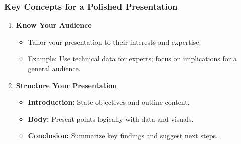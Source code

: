 \documentclass[aspectratio=169]{beamer}
\begin{document}
\begin{frame}
    \frametitle{Key Concepts for a Polished Presentation}
    \begin{enumerate}
        \item \textbf{Know Your Audience}
            \begin{itemize}
                \item Tailor your presentation to their interests and expertise.
                \item Example: Use technical data for experts; focus on implications for a general audience.
            \end{itemize}
        
        \item \textbf{Structure Your Presentation}
            \begin{itemize}
                \item \textbf{Introduction:} State objectives and outline content.
                \item \textbf{Body:} Present points logically with data and visuals.
                \item \textbf{Conclusion:} Summarize key findings and suggest next steps.
            \end{itemize}
    \end{enumerate}
\end{frame}
\end{document}
